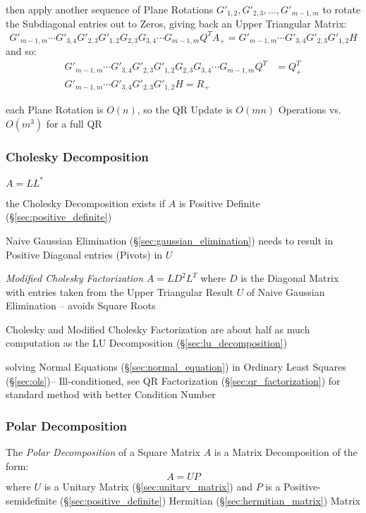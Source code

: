 then apply another sequence of Plane Rotations $G'_{1,2}, G'_{2,3}, \ldots,
G'_{m-1,m}$ to rotate the Subdiagonal entries out to Zeros, giving back an
Upper Triangular Matrix:
\[
  G'_{m-1,m}\cdots G'_{3,4}G'_{2,3}G'_{1,2}G_{2,3}G_{3,4}\cdots G_{m-1,m}
    Q^T A_+ =
  G'_{m-1,m}\cdots G'_{3,4}G'_{2,3}G'_{1,2}H
\]
and so:
\begin{align*}
  G'_{m-1,m}\cdots G'_{3,4}G'_{2,3}G'_{1,2}G_{2,3}G_{3,4}\cdots G_{m-1,m} Q^T
    & = Q_+^T \\
  G'_{m-1,m}\cdots G'_{3,4}G'_{2,3}G'_{1,2}H = R_+
\end{align*}

each Plane Rotation is $O(n)$, so the QR Update is $O(mn)$ Operations vs.
$O(m^3)$ for a full QR



\subsubsection{Cholesky Decomposition}\label{sec:cholesky_decomposition}

$A = LL^*$

the Cholesky Decomposition exists if $A$ is Positive Definite
(\S\ref{sec:positive_definite})

Naive Gaussian Elimination (\S\ref{sec:gaussian_elimination}) needs to result
in Positive Diagonal entries (Pivots) in $U$

\emph{Modified Cholesky Factorization} $A = L D^2 L^T$ where $D$ is the
Diagonal Matrix with entries taken from the Upper Triangular Result $U$ of
Naive Gaussian Elimination -- avoids Square Roots

Cholesky and Modified Cholesky Factorization are about half as much computation
as the LU Decomposition (\S\ref{sec:lu_decomposition})

solving Normal Equations (\S\ref{sec:normal_equation}) in Ordinary Least Squares
(\S\ref{sec:ols})-- Ill-conditioned, see QR Factorization
(\S\ref{sec:qr_factorization}) for standard method with better Condition Number



\subsubsection{Polar Decomposition}\label{sec:polar_decomposition}

The \emph{Polar Decomposition} of a Square Matrix $A$ is a Matrix Decomposition
of the form:
\[
  A = U P
\]
where $U$ is a Unitary Matrix (\S\ref{sec:unitary_matrix}) and $P$ is a
Positive-semidefinite (\S\ref{sec:positive_definite}) Hermitian
(\S\ref{sec:hermitian_matrix}) Matrix



